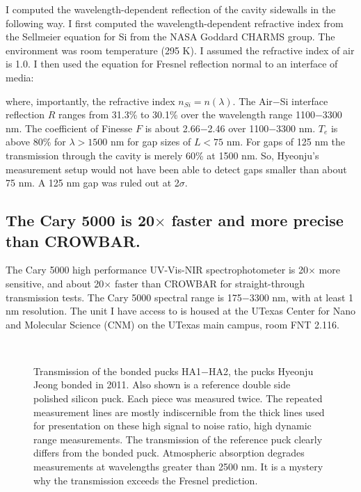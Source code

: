 I computed the wavelength-dependent reflection of the cavity sidewalls in the following way.  I first computed the wavelength-dependent refractive index from the Sellmeier equation for Si from the NASA Goddard CHARMS group\cite{2006SPIE.6273E..77F}.  The environment was room temperature (295 K).  I assumed the refractive index of air is 1.0.  I then used the equation for Fresnel reflection normal to an interface of media: 


where, importantly, the refractive index $n_{Si}=n(\lambda)$.  The Air$-$Si interface reflection $R$ ranges from 31.3\% to 30.1\% over the wavelength range 1100$-$3300 nm.  The coefficient of Finesse $F$ is about 2.66$-$2.46 over 1100$-$3300 nm.  $T_e$ is above 80\% for $\lambda > 1500$ nm for gap sizes of $L< 75$ nm.  For gaps of 125 nm the transmission through the cavity is merely 60\% at 1500 nm.  So, Hyeonju's measurement setup would not have been able to detect gaps smaller than about 75 nm.  A 125 nm gap was ruled out at 2$\sigma$.

\subsection{The Cary 5000 is 20$\times$ faster and more precise than CROWBAR.}

The Cary 5000 high performance UV-Vis-NIR spectrophotometer is 20$\times$ more sensitive, and about 20$\times$ faster than CROWBAR for straight-through transmission tests.  The Cary 5000 spectral range is 175$-$3300 nm, with at least 1 nm resolution.  The unit I have access to is housed at the UTexas Center for Nano and Molecular Science (CNM) on the UTexas main campus, room FNT 2.116.

\begin{figure}[h!] 
\begin{center}
\ 
\caption[Cary 5000 transmission]{Transmission of the bonded pucks HA1$-$HA2, the pucks Hyeonju Jeong bonded in 2011.  Also shown is a reference double side polished silicon puck.  Each piece was measured twice.  The repeated measurement lines are mostly indiscernible from the thick lines used for presentation on these high signal to noise ratio, high dynamic range measurements.  The transmission of the reference puck clearly differs from the bonded puck.  Atmospheric absorption degrades measurements at wavelengths greater than 2500 nm.  It is a mystery why the transmission exceeds the Fresnel prediction.}
\label{fig:Cary500}
\end{center}
\end{figure}


